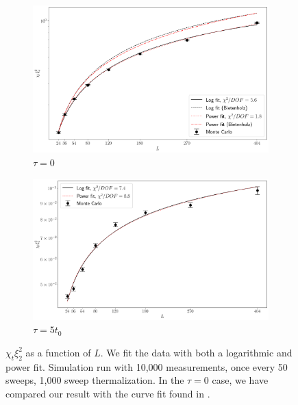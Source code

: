 \documentclass[a4paper,11pt]{article}
\begin{document}
\begin{figure}[h!]
    \begin{center}
      \begin{subfigure}[b]{0.45\textwidth}
          \centering
          \includegraphics[width=\textwidth]{divergence.png}
          \caption{$\tau = 0$}
      \end{subfigure} %
      \begin{subfigure}[b]{0.45\textwidth}
          \centering
          \includegraphics[width=\textwidth]{divergence_flowed.png}
          \caption{$\tau = 5t_0$}
      \end{subfigure}
      \caption{\label{fig:divergence} $\chi_t\xi_2^2$ as a function of $L$. We fit the data with both a logarithmic and power fit. Simulation run with 10,000 measurements, once every 50 sweeps, 1,000 sweep thermalization. In the $\tau=0$ case, we have compared our result with the curve fit found in \cite{bietenholz2018}.}
    \end{center}
\end{figure}
\end{document}
